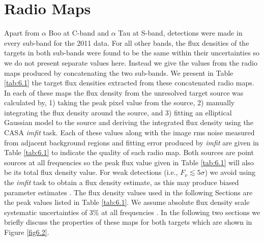\section{Radio Maps}\label{sec:6.2}
Apart from $\alpha$ Boo at C-band and $\alpha$ Tau at S-band, detections were made in every sub-band for the 2011 data. For all other bands, the flux densities of the targets in both sub-bands were found to be the same within their uncertainties so we do not present separate values here. Instead we give the values from the radio maps produced by concatenating the two sub-bands. We present in Table \ref{tab:6.1} the target flux densities extracted from these concatenated radio maps. In each of these maps the flux density from the unresolved target source was calculated by, 1) taking the peak pixel value from the source, 2) manually integrating the flux density around the source, and 3) fitting an elliptical Gaussian model to the source and deriving the integrated flux density using the CASA \textit{imfit} task. Each of these values along with the image rms noise measured from adjacent background regions and fitting error produced by \textit{imfit} are given in Table \ref{tab:6.1} to indicate the quality of each radio map. Both sources are point sources at all frequencies so the peak flux value given in Table \ref{tab:6.1} will also be its total flux density value. For weak detections (i.e., $F_{\nu} \lesssim 5\sigma$) we avoid using the \textit{imfit} task to obtain a flux density estimate, as this may produce biased parameter estimates \citep{taylor_1999}. The flux density values used in the following Sections are the peak values listed in Table \ref{tab:6.1}. We assume absolute flux density scale systematic uncertainties of  3\% at all frequencies \citep{perley_2013}. In the following two sections we briefly discuss the properties of these maps for both targets which are shown in Figure \ref{fig6.2}.



